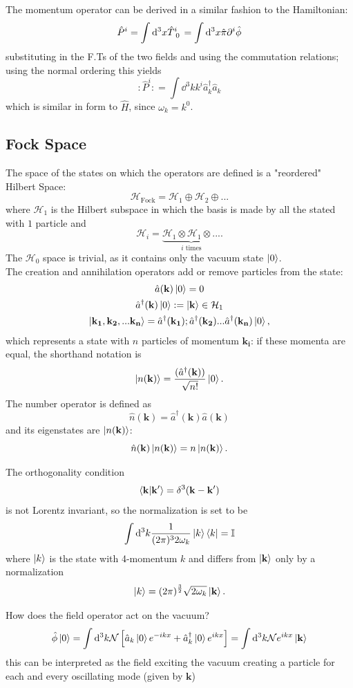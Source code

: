 
The momentum operator can be derived in a similar fashion to the Hamiltonian:
$$\hat P^i = \int \dd^3x \hat T\indices{^i_0} = \int \dd ^3x\hat\pi\pd^i\hat\phi$$
substituting in the F.Ts of the two fields and using the commutation relations;
using the normal ordering this yields
$$:\hat P^i: = \int \dd^3k k^i\hat a^\dagger_k \hat a_k$$
which is similar in form to $\hat H$, since $\omega_k=k^0$.
\subsection{Fock Space}
The space of the states on which the operators are defined is 
a "reordered" Hilbert Space:
$$\mathcal{H}_\text{Fock} = \mathcal{H}_1\oplus\mathcal{H}_2\oplus...$$
where $\mathcal{H}_1$ is the Hilbert subspace in which the basis is made
by all the stated with $1$ particle and
$$\mathcal{H}_i = \underbrace{\mathcal{H}_1\otimes\mathcal{H}_1\otimes...}_
{i \text{ times}}.$$
The $\mathcal{H}_0$ space is trivial, as it contains only the vacuum state
$\ket{0}$.\\

The creation and annihilation operators add or remove particles from the state:
\begin{gather*}
\hat a(\mathbf{k})\ket{0}=0\\
\hat a^\dagger(\mathbf{k})\ket{0} := \ket{\mathbf{k}}\in\mathcal{H}_1\\
\ket{\mathbf{k_1,k_2,...k_n}} = \hat a^\dagger(\mathbf{k_1});
\hat a^\dagger(\mathbf{k_2})...\hat a^\dagger(\mathbf{k_n})\ket{0},
\end{gather*}
which represents a state with $n$ particles of momentum $\mathbf{k_i}$: if these
momenta are equal, the shorthand notation is
$$\ket{n(\mathbf{k})}=\frac{(\hat a^\dagger(\mathbf{k}))}{\sqrt{n!}}\ket{0}.$$
The number operator is defined as
$$\hat n(\mathbf{k}) = \hat a^\dagger(\mathbf{k})\hat a(\mathbf{k})$$
and its eigenstates are $\ket{n(\mathbf{k})}$:
$$\hat n(\mathbf{k})\ket{n(\mathbf{k})}=n\ket{n(\mathbf{k})}.$$

The orthogonality condition
$$\bra{\mathbf{k}}\ket{\mathbf{k'}}=\delta^3(\mathbf{k-k'})$$
is not Lorentz invariant, so the normalization is set to be
$$\int \dd^3k\frac{1}{(2\pi)^32\omega_k}\ket{k}\bra{k}=\mathbb{I}$$
where $\ket{k}$ is the state with 4-momentum $k$ and differs
from $\ket{\mathbf{k}}$ only by a normalization
$$\ket{k} = (2\pi)^{\frac{3}{2}}\sqrt{2\omega_k}\ket{\mathbf{k}}.$$

How does the field operator act on the vacuum?
$$\hat\phi\ket{0} = \int \dd^3k\mathcal{N}\left[\hat a_k\ket{0}e^{-ikx}
    +\hat a_k^\dagger\ket{0}e^{ikx}
\right] = \int \dd^3k \mathcal{N} e^{ikx}\ket{\mathbf{k}}$$
this can be interpreted as the field exciting the vacuum creating
a particle for each and every oscillating mode (given by $\mathbf{k}$)

